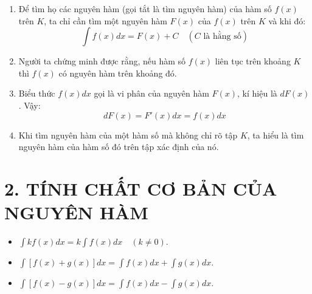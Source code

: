 \documentclass[12pt,a4paper]{extarticle}
\begin{document}
\begin{center}
    \begin{minipage}{0.58\textwidth}
        \begin{enumerate}[label=\alph*), leftmargin=*, itemsep=0.8em]
            \item Để tìm họ các nguyên hàm (gọi tắt là tìm nguyên hàm) của hàm số $f(x)$ trên $K$, ta chỉ cần tìm một nguyên hàm $F(x)$ của $f(x)$ trên $K$ và khi đó:
            \[
            \int f(x)dx = F(x) + C \quad (C \text{ là hằng số})
            \]
            \item Người ta chứng minh được rằng, nếu hàm số $f(x)$ liên tục trên khoảng $K$ thì $f(x)$ có nguyên hàm trên khoảng đó.
            \item Biểu thức $f(x)dx$ gọi là vi phân của nguyên hàm $F(x)$, kí hiệu là $dF(x)$. Vậy:
            \[
            dF(x) = F'(x)dx = f(x)dx
            \]
            \item Khi tìm nguyên hàm của một hàm số mà không chỉ rõ tập $K$, ta hiểu là tìm nguyên hàm của hàm số đó trên tập xác định của nó.
        \end{enumerate}
    \end{minipage}
    \hfill
    \begin{minipage}{0.38\textwidth}
        \centering
    \end{minipage}
\end{center}
\vspace{2.5em}

\section*{\color{blue!80!black}2. TÍNH CHẤT CƠ BẢN CỦA NGUYÊN HÀM}

\begin{itemize}[leftmargin=*, label={\color{blue!80!black}$\bullet$}, itemsep=0.8em]
    \item $\displaystyle \int kf(x)dx = k\int f(x)dx \quad (k \neq 0)$.
    \item $\displaystyle \int [f(x) + g(x)]dx = \int f(x)dx + \int g(x)dx$.
    \item $\displaystyle \int [f(x) - g(x)]dx = \int f(x)dx - \int g(x)dx$.
\end{itemize}
\end{document}
